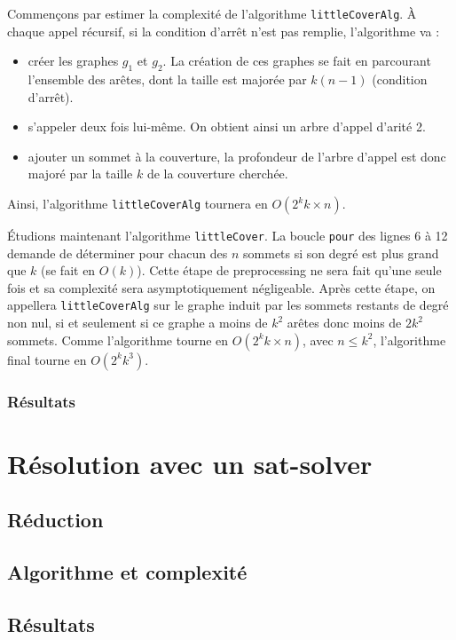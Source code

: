 \documentclass[a4paper,10pt]{article}
\newcommand*{\itemb}{\item[$\bullet$]}
\begin{document}
Commençons par estimer la complexité de l'algorithme \texttt{littleCoverAlg}. À chaque appel récursif, si la condition d'arrêt n'est pas remplie, l'algorithme va :
\begin{itemize}
 \itemb créer les graphes $g_1$ et $g_2$. La création de ces graphes se fait en parcourant l'ensemble des arêtes, dont la taille est majorée par $k(n-1)$ (condition d'arrêt).
 \itemb s'appeler deux fois lui-même. On obtient ainsi un arbre d'appel d'arité 2.
 \itemb ajouter un sommet à la couverture, la profondeur de l'arbre d'appel est donc majoré par la taille $k$ de la couverture cherchée.
\end{itemize}

Ainsi, l'algorithme \texttt{littleCoverAlg} tournera en $O(2^k k\times n)$. 

\vspace{0.35cm}
Étudions maintenant l'algorithme \texttt{littleCover}. La boucle \texttt{pour} des lignes 6 à 12 demande de déterminer pour chacun des $n$ sommets si son degré est plus grand que $k$ (se fait en $O(k)$). Cette étape de preprocessing ne sera fait qu'une seule fois et sa complexité sera asymptotiquement négligeable. Après cette étape, on appellera \texttt{littleCoverAlg} sur le graphe induit par les sommets restants de degré non nul, si et seulement si ce graphe a moins de $k^2$ arêtes donc moins de $2k^2$ sommets. Comme l'algorithme tourne en $O(2^k k\times n)$, avec $n\leqslant k^2$, l'algorithme final tourne en $O(2^k k^3)$.

\subsubsection{Résultats}

\section{Résolution avec un sat-solver}


\subsection{Réduction}

\subsection{Algorithme et complexité}


\subsection{Résultats}
\end{document}
